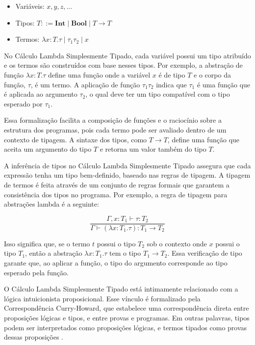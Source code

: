 \begin{itemize}
  \item Variáveis: $x, y, z, ...$
  \item Tipos: $T ::= \mathbf{Int} \mid \mathbf{Bool} \mid T \to T$
  \item Termos: $\lambda x:T. \tau \mid \tau_1 \tau_2 \mid x$
\end{itemize}

No Cálculo Lambda Simplesmente Tipado, cada variável possui um tipo atribuído e os termos são construídos com base nesses tipos.
Por exemplo, a abstração de função $\lambda x:T. \tau$ define uma função onde a variável $x$ é de tipo $T$ e o corpo da função, $\tau$, é um termo.
A aplicação de função $\tau_1 \tau_2$ indica que $\tau_1$ é uma função que é aplicada ao argumento $\tau_2$, o qual deve ter um tipo compatível com o tipo esperado por $\tau_1$.

Essa formalização facilita a composição de funções e o raciocínio sobre a estrutura dos programas, pois cada termo pode ser avaliado dentro de um contexto de tipagem.
A sintaxe dos tipos, como $T \to T$, define uma função que aceita um argumento do tipo $T$ e retorna um valor também do tipo $T$.

A inferência de tipos no Cálculo Lambda Simplesmente Tipado assegura que cada expressão tenha um tipo bem-definido, baseado nas regras de tipagem.
A tipagem de termos é feita através de um conjunto de regras formais que garantem a consistência dos tipos no programa.
Por exemplo, a regra de tipagem para abstrações lambda é a seguinte:

\[
  \frac{\Gamma, x:T_1 \vdash \tau:T_2}{\Gamma \vdash (\lambda x:T_1. \tau): T_1 \to T_2}
\]

Isso significa que, se o termo $t$ possui o tipo $T_2$ sob o contexto onde $x$ possui o tipo $T_1$, então a abstração $\lambda x:T_1. \tau$ tem o tipo $T_1 \to T_2$.
Essa verificação de tipo garante que, ao aplicar a função, o tipo do argumento corresponde ao tipo esperado pela função.

O Cálculo Lambda Simplesmente Tipado está intimamente relacionado com a lógica intuicionista proposicional.
Esse vínculo é formalizado pela Correspondência Curry-Howard, que estabelece uma correspondência direta entre proposições lógicas e tipos, e entre provas e programas.
Em outras palavras, tipos podem ser interpretados como proposições lógicas, e termos tipados como provas dessas proposições \cite{PIERCE2002}.

